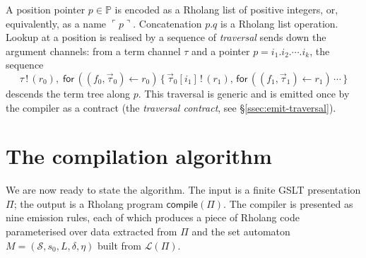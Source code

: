 \documentclass[11pt]{article}
\theoremstyle{plain}
\theoremstyle{definition}
\theoremstyle{remark}
\newcommand{\reflect}[1]{\ulcorner #1 \urcorner}
\newcommand{\Pos}{\mathbb{P}}
\newcommand{\States}{\mathcal{S}}
\newcommand{\Lhs}{\mathcal{L}}
\newcommand{\Send}[2]{#1 \,!\, (#2)}
\begin{document}
A position pointer $p \in \Pos$ is encoded as a Rholang list of positive
integers, or, equivalently, as a name $\reflect{p}$. Concatenation
$p.q$ is a Rholang list operation. Lookup at a position is realised by a
sequence of \emph{traversal} sends down the argument channels: from a
term channel $\tau$ and a pointer $p = i_1 . i_2 . \cdots . i_k$, the
sequence
\[
  \Send{\tau}{r_0},\;
  \mathsf{for}\, ((f_0, \vec{\tau}_0) \leftarrow r_0)\,
  \{\, \Send{\vec{\tau}_0[i_1]}{r_1},\,
       \mathsf{for}\,((f_1, \vec{\tau}_1) \leftarrow r_1)\, \cdots \,\}
\]
descends the term tree along $p$. This traversal is generic and is emitted
once by the compiler as a contract (the \emph{traversal contract}, see
\S\ref{ssec:emit-traversal}).

\section{The compilation algorithm}\label{sec:compile}

We are now ready to state the algorithm. The input is a finite GSLT
presentation $\Pi$; the output is a Rholang program $\mathsf{compile}(\Pi)$.
The compiler is presented as nine emission rules, each of which produces a
piece of Rholang code parameterised over data extracted from $\Pi$ and the
set automaton $M = (\States, s_0, L, \delta, \eta)$ built from $\Lhs(\Pi)$.
\end{document}
